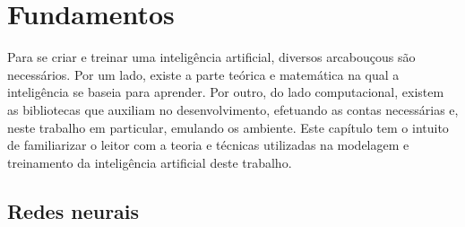 %




\chapter{Fundamentos}
\label{cap:fundamentos}

Para se criar e treinar uma inteligência artificial, diversos arcabouçous são necessários.
Por um lado, existe a parte teórica e matemática na qual a inteligência se baseia para aprender. 
Por outro, do lado computacional, existem as bibliotecas que auxiliam no desenvolvimento, efetuando as contas necessárias e, neste trabalho em particular, emulando os ambiente.
Este capítulo tem o intuito de familiarizar o leitor com a teoria e técnicas utilizadas na modelagem e treinamento da inteligência artificial deste trabalho.


\section{Redes neurais}
\label{sec:nn}

